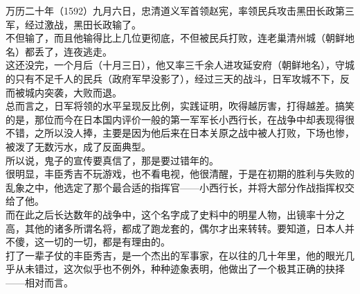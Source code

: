 \begin{multicols}{\theparacolNo}
万历二十年（1592）九月六日，忠清道义军首领赵宪，率领民兵攻击黑田长政第三军，经过激战，黑田长政输了。\\

不但输了，而且他输得比上几位更彻底，不但被民兵打败，连老巢清州城（朝鲜地名）都丢了，连夜逃走。\\

这还没完，一个月后（十月三日），他又率三千余人进攻延安府（朝鲜地名），守城的只有不足千人的民兵（政府军早没影了），经过三天的战斗，日军攻城不下，反而被城内突袭，大败而退。\\

总而言之，日军将领的水平呈现反比例，实践证明，吹得越厉害，打得越差。搞笑的是，那位而今在日本国内评价一般的第一军军长小西行长，在战争中却表现得很不错，之所以没人捧，主要是因为他后来在日本关原之战中被人打败，下场也惨，被泼了无数污水，成了反面典型。\\

所以说，鬼子的宣传要真信了，那是要过错年的。\\

很明显，丰臣秀吉不玩游戏，也不看电视，他很清醒，于是在初期的胜利与失败的乱象之中，他选定了那个最合适的指挥官——小西行长，并将大部分作战指挥权交给了他。\\

而在此之后长达数年的战争中，这个名字成了史料中的明星人物，出镜率十分之高，其他的诸多所谓名将，都成了跑龙套的，偶尔才出来转转。要知道，日本人并不傻，这一切的一切，都是有理由的。\\

打了一辈子仗的丰臣秀吉，是一个杰出的军事家，在以往的几十年里，他的眼光几乎从未错过，这次似乎也不例外，种种迹象表明，他做出了一个极其正确的抉择——相对而言。\\

\ifnum{}
	\end{multicols}
\fi
\newpage

